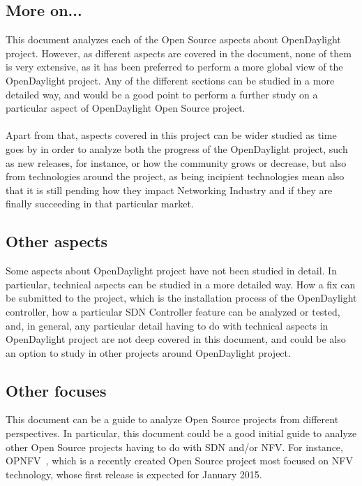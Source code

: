 \documentclass[a4paper, 12pt]{book}
\begin{document}
\subsection{More on...}

This document analyzes each of the Open Source aspects about OpenDaylight project. However, as different aspects are covered in the document, none of them is very extensive, as it has been preferred to perform a more global view of the OpenDaylight project. Any of the different sections can be studied in a more detailed way, and would be a good point to perform a further study on a particular aspect of OpenDaylight Open Source project.\\
\\
Apart from that, aspects covered in this project can be wider studied as time goes by in order to analyze both the progress of the OpenDaylight project, such as new releases, for instance, or how the community grows or decrease, but also from technologies around the project, as being incipient technologies mean also that it is still pending how they impact Networking Industry and if they are finally succeeding in that particular market.

\subsection{Other aspects}

Some aspects about OpenDaylight project have not been studied in detail. In particular, technical aspects can be studied in a more detailed way. How a fix can be submitted to the project, which is the installation process of the OpenDaylight controller, how a particular SDN Controller feature can be analyzed or tested, and, in general, any particular detail having to do with technical aspects in OpenDaylight project are not deep covered in this document, and could be also an option to study in other projects around OpenDaylight project.

\subsection{Other focuses}

This document can be a guide to analyze Open Source projects from different perspectives. In particular, this document could be a good initial guide to analyze other Open Source projects having to do with SDN and/or NFV. For instance, OPNFV~\cite{OPNFV}, which is a recently created Open Source project most focused on NFV technology, whose first release is expected for January 2015.
\end{document}
